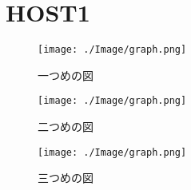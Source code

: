 \documentclass[uplatex,a4paper,landscape]{jsarticle}
\begin{document}

\section{HOST1}
\begin{figure}[htbp]
 \begin{minipage}{0.33\hsize}
  \begin{center}
   \texttt{[image: ./Image/graph.png]}
  \end{center}
  \caption{一つめの図}
  \label{fig:one}
 \end{minipage}
 \begin{minipage}{0.33\hsize}
 \begin{center}
  \texttt{[image: ./Image/graph.png]}
 \end{center}
  \caption{二つめの図}
  \label{fig:two}
 \end{minipage}
 \begin{minipage}{0.33\hsize}
 \begin{center}
  \texttt{[image: ./Image/graph.png]}
 \end{center}
  \caption{三つめの図}
  \label{fig:three}
 \end{minipage}
\end{figure}

\end{document}
